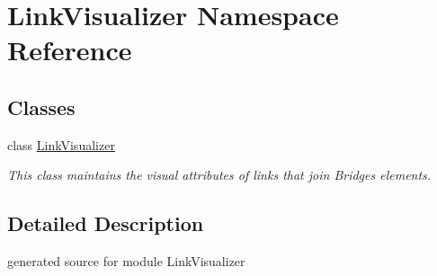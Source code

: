 \hypertarget{namespace_link_visualizer}{}\section{Link\+Visualizer Namespace Reference}
\label{namespace_link_visualizer}
\subsection*{Classes}
\begin{DoxyCompactItemize}
\item 
class \hyperlink{class_link_visualizer_1_1_link_visualizer}{Link\+Visualizer}
\begin{DoxyCompactList}\small\item\em This class maintains the visual attributes of links that join Bridges elements. \end{DoxyCompactList}\end{DoxyCompactItemize}


\subsection{Detailed Description}
\begin{DoxyVerb}generated source for module LinkVisualizer \end{DoxyVerb}
 